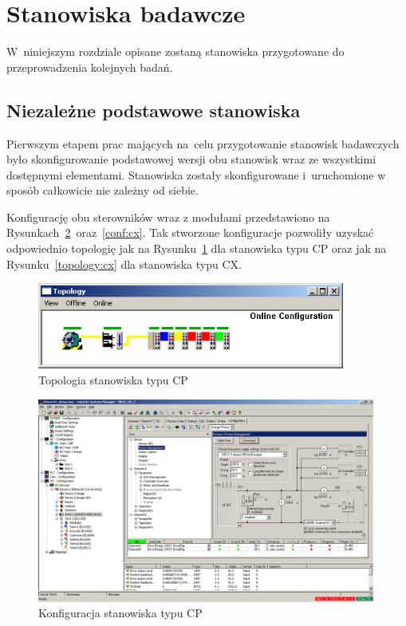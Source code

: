 \section{Stanowiska badawcze}
W~niniejszym rozdziale opisane zostaną stanowiska przygotowane do przeprowadzenia kolejnych badań.

\subsection{Niezależne podstawowe stanowiska}
Pierwszym etapem prac mających na~celu przygotowanie stanowisk badawczych było skonfigurowanie podstawowej wersji obu stanowisk wraz ze wszystkimi dostępnymi elementami. Stanowiska zostały skonfigurowane i~uruchomione w sposób całkowicie nie zależny od siebie.

Konfigurację obu sterowników wraz z modułami przedstawiono na Rysunkach~\ref{conf:cp}~oraz~\ref{conf:cx}. Tak stworzone konfiguracje pozwoliły uzyskać odpowiednio topologię jak na Rysunku~\ref{topology:cp} dla stanowiska typu CP oraz jak na Rysunku~\ref{topology:cx} dla stanowiska typu CX.
\begin{figure}[!htb] 	\centering 	\includegraphics[width=0.9\textwidth]{images/topologyCP} \caption{Topologia stanowiska typu CP} \label{topology:cp} \end{figure}
\begin{figure}[!htb] 	\centering 	\includegraphics[width=0.99\textwidth]{images/confCP} \caption{Konfiguracja stanowiska typu CP} \label{conf:cp} \end{figure}

